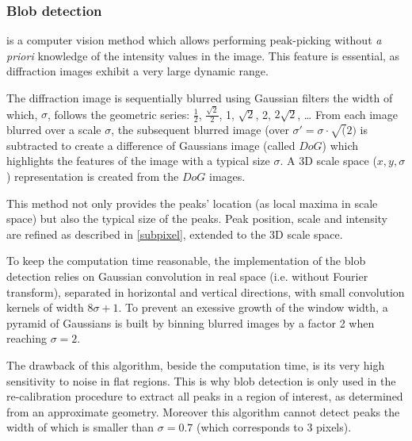 \documentclass{iucr}
\begin{document}
\subsubsection{Blob detection}
\label{blob}
is a computer vision method which allows performing peak-picking without
\textit{a priori} knowledge of the intensity values in the image.
This feature is essential, as diffraction images exhibit a very large
dynamic range.

The diffraction image is sequentially blurred using Gaussian filters the 
width of which, $\sigma$, follows the geometric series: $\frac{1}{2}$,
$\frac{\sqrt{2}}{2}$, 1, $\sqrt{2}$, 2, $2\sqrt{2}$, \ldots
From each image blurred over a scale $\sigma$, the subsequent
blurred image (over $\sigma'=\sigma\cdot\sqrt(2)$
is subtracted to create a difference of Gaussians
image (called $DoG$) which highlights the features of the image with a typical
size $\sigma$.
A 3D scale space ($x,y,\sigma$) representation is created from the $DoG$
images.

This method  not only provides the peaks' location (as local maxima in
scale space) but also the typical size of the peaks.
Peak position, scale and intensity are refined as described in
\ref{subpixel}, extended to the 3D scale space.

To keep the computation time reasonable, the implementation of the blob
detection relies on Gaussian convolution in real space (i.e. without Fourier
transform), separated in horizontal and vertical directions, with small
convolution kernels of width $8 \sigma +1$.
To prevent an exessive growth of the window width, a pyramid
of Gaussians is built by binning blurred images by a factor 2 when reaching
$\sigma=2$.

The drawback of this algorithm, beside the computation time, is its very high
sensitivity to noise in flat regions.
This is why blob detection is only used in the re-calibration procedure to
extract all peaks in a region of interest, as determined from an
approximate geometry.
Moreover this algorithm cannot detect peaks the width of which is smaller than
$\sigma=0.7$ (which corresponds to 3 pixels).
\end{document}
